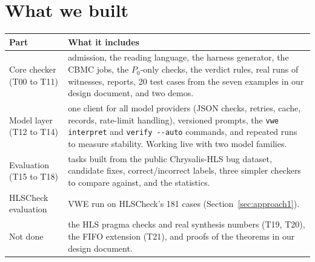 \documentclass[10pt,a4paper]{article}
\newcommand{\Pz}{P_0}\newcommand{\Po}{P_1}
\begin{document}
\section{What we built}
\begin{center}\small
\noindent\begin{tabularx}{\linewidth}{@{}l>{\raggedright\arraybackslash}X@{}}\toprule
Part & What it includes\\\midrule
Core checker (T00 to T11) & admission, the reading language, the harness generator, the CBMC
jobs, the $\Pz$-only checks, the verdict rules, real runs of witnesses, reports, 20 test cases from
the seven examples in our design document, and two demos.\\
Model layer (T12 to T14) & one client for all model providers (JSON checks, retries, cache, records,
rate-limit handling), versioned prompts, the \texttt{vwe interpret} and \texttt{verify -{}-auto}
commands, and repeated runs to measure stability. Working live with two model families.\\
Evaluation (T15 to T18) & 20 tasks built from the public Chrysalis-HLS bug dataset, candidate
fixes, correct/incorrect labels, three simpler checkers to compare against, and the statistics.\\
HLSCheck evaluation & VWE run on HLSCheck's 181 cases (Section~\ref{sec:approach1}).\\
Not done & the HLS pragma checks and real synthesis numbers (T19, T20), the FIFO extension (T21),
and proofs of the theorems in our design document.\\\bottomrule
\end{tabularx}\end{center}
\end{document}
